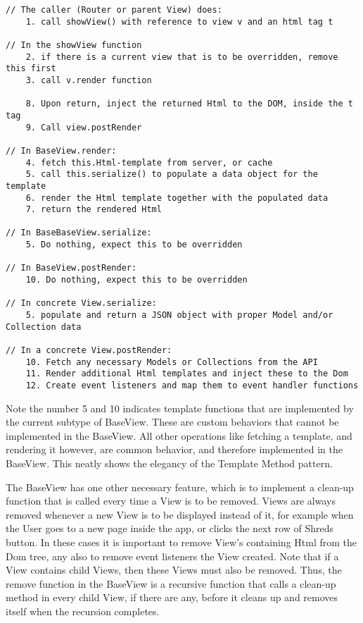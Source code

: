 \begin{lstlisting}
// The caller (Router or parent View) does:	
	1. call showView() with reference to view v and an html tag t

// In the showView function
	2. if there is a current view that is to be overridden, remove this first
	3. call v.render function
	
	8. Upon return, inject the returned Html to the DOM, inside the t tag 
	9. Call view.postRender
	
// In BaseView.render:
	4. fetch this.Html-template from server, or cache
	5. call this.serialize() to populate a data object for the template
	6. render the Html template together with the populated data
	7. return the rendered Html

// In BaseBaseView.serialize:
	5. Do nothing, expect this to be overridden
	
// In BaseView.postRender:
	10. Do nothing, expect this to be overridden

// In concrete View.serialize:
	5. populate and return a JSON object with proper Model and/or Collection data
	
// In a concrete View.postRender:
	10. Fetch any necessary Models or Collections from the API
	11. Render additional Html templates and inject these to the Dom
	12. Create event listeners and map them to event handler functions
\end{lstlisting}
Note the number 5 and 10 indicates template functions that are implemented by the current subtype of BaseView. These are custom behaviors that cannot be implemented in the BaseView. All other operations like fetching a template, and rendering it however, are common behavior, and therefore implemented in the BaseView. This neatly shows the elegancy of the Template Method pattern.

The BaseView has one other necessary feature, which is to implement a clean-up function that is called every time a View is to be removed. Views are always removed whenever a new View is to be displayed instead of it, for example  when the User goes to a new page inside the app, or clicks the next row of Shreds button. In these cases it is important to remove View's containing Html from the Dom tree, any also to remove event listeners the View created. Note that if a View contains child Views, then these Views must also be removed. Thus, the remove function in the BaseView is a recursive function that calls a clean-up method in every child View, if there are any, before it cleans up and removes itself when the recursion completes. 

